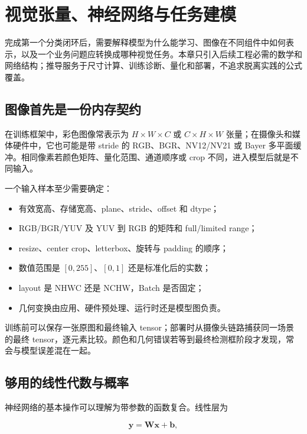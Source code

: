 \chapter{视觉张量、神经网络与任务建模}
\label{chap:edge-ai-vision-foundations}

完成第一个分类闭环后，需要解释模型为什么能学习、图像在不同组件中如何表示，以及一个业务问题应转换成哪种视觉任务。本章只引入后续工程必需的数学和网络结构；推导服务于尺寸计算、训练诊断、量化和部署，不追求脱离实践的公式覆盖。

\section{图像首先是一份内存契约}

在训练框架中，彩色图像常表示为 $H\times W\times C$ 或 $C\times H\times W$ 张量；在摄像头和媒体硬件中，它也可能是带 stride 的 RGB、BGR、NV12/NV21 或 Bayer 多平面缓冲。相同像素若颜色矩阵、量化范围、通道顺序或 crop 不同，进入模型后就是不同输入。

一个输入样本至少需要确定：

\begin{itemize}
  \item 有效宽高、存储宽高、plane、stride、offset 和 dtype；
  \item RGB/BGR/YUV 及 YUV 到 RGB 的矩阵和 full/limited range；
  \item resize、center crop、letterbox、旋转与 padding 的顺序；
  \item 数值范围是 $[0,255]$、$[0,1]$ 还是标准化后的实数；
  \item layout 是 NHWC 还是 NCHW，Batch 是否固定；
  \item 几何变换由应用、硬件预处理、运行时还是模型图负责。
\end{itemize}

训练前可以保存一张原图和最终输入 tensor；部署时从摄像头链路捕获同一场景的最终 tensor，逐元素比较。颜色和几何错误若等到最终检测框阶段才发现，常会与模型误差混在一起。

\section{够用的线性代数与概率}

神经网络的基本操作可以理解为带参数的函数复合。线性层为

\begin{equation}
  \mathbf{y}=\mathbf{W}\mathbf{x}+\mathbf{b},
\end{equation}

